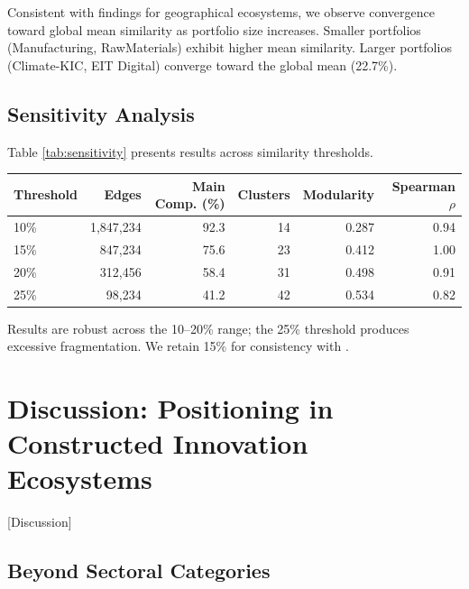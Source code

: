 \documentclass[../main.tex]{subfiles}
\begin{document}
Consistent with \cite{basole2019visual} findings for geographical ecosystems, we observe convergence toward global mean similarity as portfolio size increases. Smaller portfolios (Manufacturing, RawMaterials) exhibit higher mean similarity. Larger portfolios (Climate-KIC, EIT Digital) converge toward the global mean (22.7\%).

\subsection{Sensitivity Analysis}

Table \ref{tab:sensitivity} presents results across similarity thresholds.

\begin{center}
\small
\begin{tabular}{lrrrrr}
\toprule
\textbf{Threshold} & \textbf{Edges} & \textbf{Main Comp. (\%)} & \textbf{Clusters} & \textbf{Modularity} & \textbf{Spearman $\rho$} \\
\midrule
10\% & 1,847,234 & 92.3 & 14 & 0.287 & 0.94 \\
15\% & 847,234 & 75.6 & 23 & 0.412 & 1.00 \\
20\% & 312,456 & 58.4 & 31 & 0.498 & 0.91 \\
25\% & 98,234 & 41.2 & 42 & 0.534 & 0.82 \\
\bottomrule
\end{tabular}
\end{center}

Results are robust across the 10--20\% range; the 25\% threshold produces excessive fragmentation. We retain 15\% for consistency with \cite{basole2019visual}.

\section{Discussion: Positioning in Constructed Innovation Ecosystems}[Discussion]

\subsection{Beyond Sectoral Categories}
\end{document}
